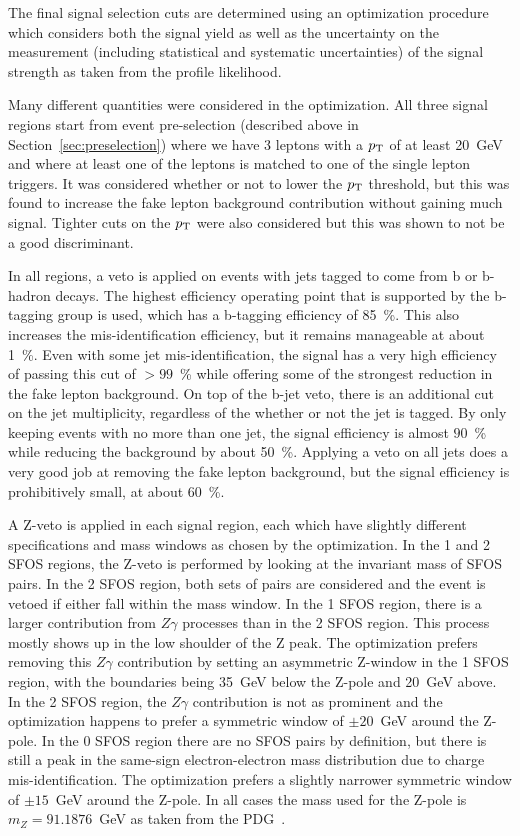 The final signal selection cuts are determined using an optimization
procedure which considers both the signal yield as well as the uncertainty
on the measurement (including statistical and systematic uncertainties)
of the signal strength as taken from the profile likelihood. 

Many different quantities were considered in the optimization.  All three signal 
regions start from event pre-selection (described above in Section~\ref{sec:preselection}) where 
we have 3 leptons with a $p_{\mathrm{T}}$ of at least 20~GeV 
and where at least one of the leptons is matched to one of the single lepton triggers.
It was considered whether or not to lower the $p_{\mathrm{T}}$ threshold, but this was found to increase
the fake lepton background contribution without gaining much signal. Tighter cuts on the $p_{\mathrm{T}}$
were also considered but this was shown to not be a good discriminant. 

In all regions, 
a veto is applied on events with jets tagged to come from b or b-hadron decays. The highest
efficiency operating point that is supported by the b-tagging group is used,
which has a b-tagging efficiency of 85~\%.  This also increases the mis-identification efficiency, 
but it remains manageable at about 1~\%. Even with some jet mis-identification, the signal has
a very high efficiency of passing this cut of $> 99$~\% while offering some of the strongest 
reduction in the fake lepton background. On top of the b-jet veto, there is an additional
cut on the jet multiplicity, regardless of the whether or not the jet is tagged. By only keeping
events with no more than one jet, the signal efficiency is almost $90$~\% while reducing
the background by about 50~\%.  Applying a veto on all jets does a very good job at removing the fake lepton
background, but the signal efficiency is prohibitively small, at about 60~\%. 

A Z-veto is applied in each signal region, 
each which have slightly different specifications and mass windows
as chosen by the optimization. In the 1 and 2 SFOS regions, the Z-veto is performed
by looking at the invariant mass of SFOS pairs. In the 2 SFOS region, both sets of pairs
are considered and the event is vetoed if either fall within the mass window.  In the 
1 SFOS region, there is a larger contribution from $Z\gamma$ processes than in the 2 SFOS
region.  This process mostly shows up in the low shoulder of the Z peak. The optimization
prefers removing this $Z\gamma$ contribution by setting an asymmetric Z-window in the 1 SFOS
region, with the boundaries being 35~GeV below the Z-pole and 20~GeV above. In the 2 SFOS region,
the $Z\gamma$ contribution is not as prominent and the optimization happens to prefer a symmetric
window of $\pm20$~GeV around the Z-pole.  In the 0 SFOS region there are no SFOS pairs by definition,
but there is still a peak in the same-sign electron-electron mass distribution due to charge mis-identification.
The optimization prefers a slightly narrower symmetric window of $\pm15$~GeV around the Z-pole. In all cases
the mass used for the Z-pole is $m_{Z}=91.1876$~GeV as taken from the PDG~\cite{PDG:2014}. 

